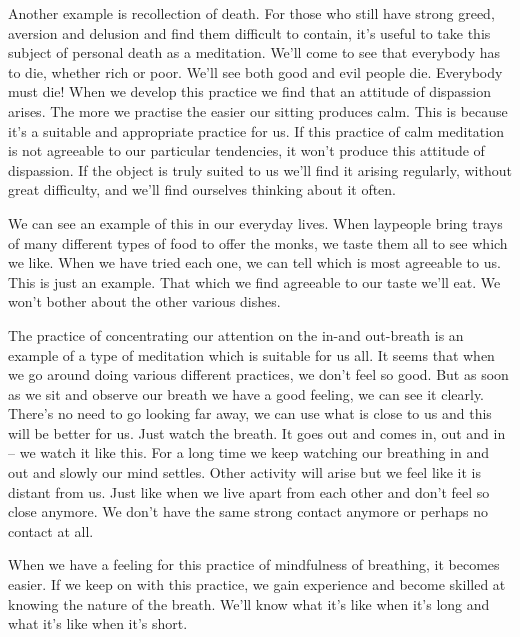 Another example is recollection of death. For those who still have strong greed, aversion and delusion and find them difficult to contain, it's useful to take this subject of personal death as a meditation. We'll come to see that everybody has to die, whether rich or poor. We'll see both good and evil people die. Everybody must die! When we develop this practice we find that an attitude of dispassion arises. The more we practise the easier our sitting produces calm. This is because it's a suitable and appropriate practice for us. If this practice of calm meditation is not agreeable to our particular tendencies, it won't produce this attitude of dispassion. If the object is truly suited to us we'll find it arising regularly, without great difficulty, and we'll find ourselves thinking about it often.

We can see an example of this in our everyday lives. When laypeople bring trays of many different types of food to offer the monks, we taste them all to see which we like. When we have tried each one, we can tell which is most agreeable to us. This is just an example. That which we find agreeable to our taste we'll eat. We won't bother about the other various dishes.

The practice of concentrating our attention on the in-and out-breath is an example of a type of meditation which is suitable for us all. It seems that when we go around doing various different practices, we don't feel so good. But as soon as we sit and observe our breath we have a good feeling, we can see it clearly. There's no need to go looking far away, we can use what is close to us and this will be better for us. Just watch the breath. It goes out and comes in, out and in -- we watch it like this. For a long time we keep watching our breathing in and out and slowly our mind settles. Other activity will arise but we feel like it is distant from us. Just like when we live apart from each other and don't feel so close anymore. We don't have the same strong contact anymore or perhaps no contact at all.

When we have a feeling for this practice of mindfulness of breathing, it becomes easier. If we keep on with this practice, we gain experience and become skilled at knowing the nature of the breath. We'll know what it's like when it's long and what it's like when it's short.

